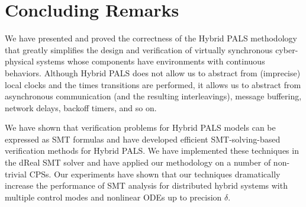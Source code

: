 
\section{Concluding Remarks}
\label{sec:concl}


We have presented and proved the correctness of the Hybrid PALS
methodology that  greatly simplifies the design and verification of
virtually synchronous cyber-physical systems whose components have
environments with continuous behaviors.  Although Hybrid PALS does not
allow us to abstract from (imprecise) local clocks and the times
transitions are performed, it allows us to abstract from asynchronous
communication (and the resulting interleavings), message buffering,
network delays, 
backoff timers, and so on.







We have shown that verification problems for Hybrid PALS models can be
expressed as SMT formulas and have developed %
efficient  SMT-solving-based verification methods for Hybrid PALS. 
We have implemented these techniques in the \textsf{dReal} SMT solver and   have
applied our methodology on a number of non-trivial CPSs. Our
experiments have shown that our techniques dramatically increase the
performance of SMT analysis for distributed hybrid systems with
multiple control modes and nonlinear ODEs up to precision $\delta$. 
